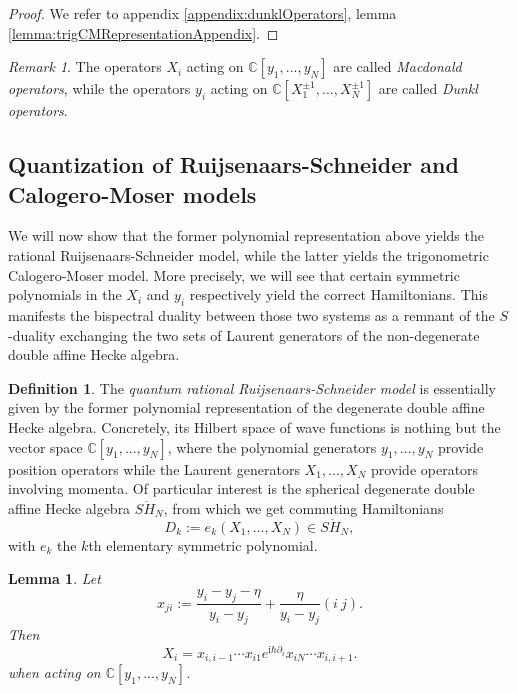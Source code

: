 \documentclass[11pt]{report}
\newtheorem{lemma}[theorem]{Lemma}
\theoremstyle{definition}
\newtheorem{definition}[theorem]{Definition}
\theoremstyle{remark}
\newtheorem*{remark}{Remark}
\theoremstyle{remark}
\newcommand{\C}{\mathbb{C}}
\newcommand{\I}{\mathrm{i}}
\begin{document}
\begin{proof}
We refer to appendix \ref{appendix:dunklOperators}, lemma \ref{lemma:trigCMRepresentationAppendix}.
\end{proof}

\begin{remark}
The operators $X_i$ acting on $\C[y_1,...,y_N]$ are called \emph{Macdonald operators}, while the operators $y_i$ acting on $\C[X_1^{\pm 1},...,X_N^{\pm 1}]$ are called \emph{Dunkl operators}.
\end{remark}

\subsection{Quantization of Ruijsenaars-Schneider and Calogero-Moser models}

We will now show that the former polynomial representation above yields the rational Ruijsenaars-Schneider model, while the latter yields the trigonometric Calogero-Moser model. More precisely, we will see that certain symmetric polynomials in the $X_i$ and $y_i$ respectively yield the correct Hamiltonians. This manifests the bispectral duality between those two systems \cite{article:chalykh:2000} as a remnant of the $S$-duality exchanging the two sets of Laurent generators of the non-degenerate double affine Hecke algebra.

\begin{definition}
The \emph{quantum rational Ruijsenaars-Schneider model} is essentially given by the former polynomial representation of the degenerate double affine Hecke algebra. Concretely, its Hilbert space of wave functions is nothing but the vector space $\C[y_1,...,y_N]$, where the polynomial generators $y_1,...,y_N$ provide position operators while the Laurent generators $X_1,...,X_N$ provide operators involving momenta. Of particular interest is the spherical degenerate double affine Hecke algebra $S\ddot H_N$, from which we get commuting Hamiltonians
\begin{equation*}
D_k := e_k(X_1,...,X_N) \in S\ddot H_N,
\end{equation*}
with $e_k$ the $k$th elementary symmetric polynomial.
\end{definition}

\begin{lemma}
Let
\begin{equation*}
x_{ji} := \frac{y_i-y_j-\eta}{y_i-y_j} + \frac{\eta}{y_i-y_j} (i \ j).
\end{equation*}
Then
\begin{equation*}
X_i = x_{i,i-1} \cdots x_{i1} e^{\I \hbar \partial_i} x_{iN} \cdots x_{i,i+1}.
\end{equation*}
when acting on $\C[y_1,...,y_N]$.
\end{lemma}
\end{document}
